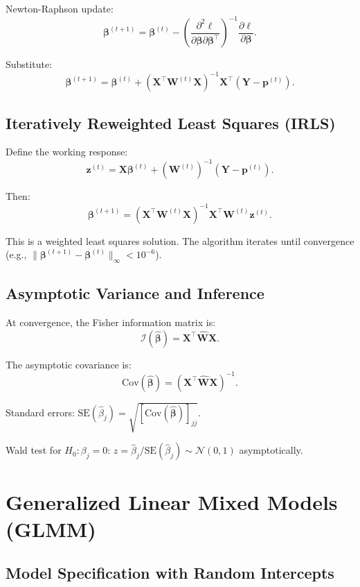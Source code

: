 \documentclass[12pt]{article}
\numberwithin{equation}{section}
\begin{document}
	Newton-Raphson update:
	\[
	\boldsymbol{\beta}^{(t+1)} = \boldsymbol{\beta}^{(t)} - \left( \frac{\partial^2 \ell}{\partial \boldsymbol{\beta} \partial \boldsymbol{\beta}^\top} \right)^{-1} \frac{\partial \ell}{\partial \boldsymbol{\beta}}.
	\]
	
	Substitute:
	\[
	\boldsymbol{\beta}^{(t+1)} = \boldsymbol{\beta}^{(t)} + (\mathbf{X}^\top \mathbf{W}^{(t)} \mathbf{X})^{-1} \mathbf{X}^\top (\mathbf{Y} - \mathbf{p}^{(t)}).
	\]
	
	\subsection{Iteratively Reweighted Least Squares (IRLS)}
	
	Define the working response:
	\[
	\mathbf{z}^{(t)} = \mathbf{X} \boldsymbol{\beta}^{(t)} + (\mathbf{W}^{(t)})^{-1} (\mathbf{Y} - \mathbf{p}^{(t)}).
	\]
	
	Then:
	\[
	\boldsymbol{\beta}^{(t+1)} = (\mathbf{X}^\top \mathbf{W}^{(t)} \mathbf{X})^{-1} \mathbf{X}^\top \mathbf{W}^{(t)} \mathbf{z}^{(t)}.
	\]
	
	This is a weighted least squares solution. The algorithm iterates until convergence (e.g., $\|\boldsymbol{\beta}^{(t+1)} - \boldsymbol{\beta}^{(t)}\|_\infty < 10^{-6}$).
	
	\subsection{Asymptotic Variance and Inference}
	
	At convergence, the Fisher information matrix is:
	\[
	\mathcal{I}(\hat{\boldsymbol{\beta}}) = \mathbf{X}^\top \hat{\mathbf{W}} \mathbf{X}.
	\]
	
	The asymptotic covariance is:
	\[
	\text{Cov}(\hat{\boldsymbol{\beta}}) = (\mathbf{X}^\top \hat{\mathbf{W}} \mathbf{X})^{-1}.
	\]
	
	Standard errors: $\text{SE}(\hat{\beta}_j) = \sqrt{[\text{Cov}(\hat{\boldsymbol{\beta}})]_{jj}}$.
	
	Wald test for $H_0: \beta_j = 0$: $z = \hat{\beta}_j / \text{SE}(\hat{\beta}_j) \sim \mathcal{N}(0,1)$ asymptotically.
	
	\section{Generalized Linear Mixed Models (GLMM)}
	
	\subsection{Model Specification with Random Intercepts}
	
\end{document}
